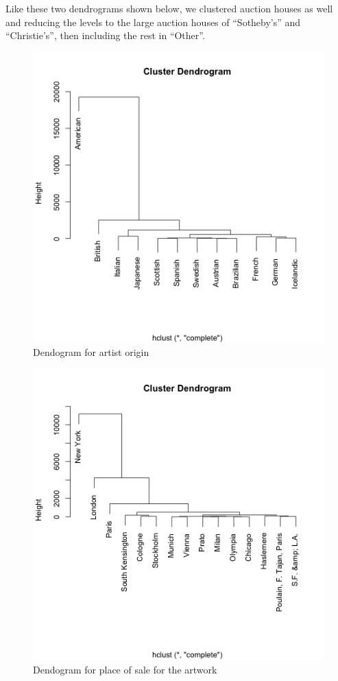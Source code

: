 \documentclass[]{asaproc}\usepackage[]{graphicx}\usepackage[]{color}
\begin{document}
Like these two dendrograms shown below, we clustered auction houses as well and reducing the levels to the large auction houses of ``Sotheby's'' and ``Christie's'', then including the rest in ``Other''.

\begin{figure}[H]

\includegraphics[scale = 0.5]{den1}
\caption{Dendogram for artist origin}
\label{origin_dendo}
\end{figure}

\begin{figure}[H]

\includegraphics[scale = 0.5]{den2}
\caption{Dendogram for place of sale for the artwork}
\label{place_dendo}
\end{figure}
\end{document}
